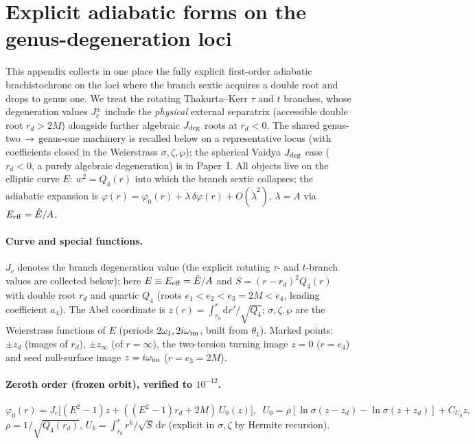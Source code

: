 \documentclass[12pt]{iopart}
\theoremstyle{plain}
\theoremstyle{definition}
\theoremstyle{remark}
\newcommand{\Ehat}{\hat E}
\newcommand{\Jc}{J_{c}}
\newcommand{\dd}{\mathrm{d}}
\begin{document}
\clearpage












\section{Explicit adiabatic forms on the genus-degeneration loci}
\label{app:separatrix}
This appendix collects in one place the fully explicit first-order adiabatic
brachistochrone on the loci where the branch sextic acquires a double root and drops to
genus one. We treat the rotating Thakurta--Kerr $\tau$ and $t$ branches, whose degeneration
values $\Jc^\pm$ include the \emph{physical} external separatrix (accessible double root
$r_d>2M$) alongside further algebraic $J_{\rm deg}$ roots at $r_d<0$. The shared
genus-two$\,\to\,$genus-one machinery is recalled below on a representative locus (with
coefficients closed in the Weierstrass $\sigma,\zeta,\wp$); the spherical Vaidya
$J_{\rm deg}$ case ($r_d<0$, a purely algebraic degeneration) is in Paper~I. All objects
live on the elliptic curve $E:\,w^2=Q_4(r)$ into which the branch sextic collapses; the
adiabatic expansion is $\varphi(r)=\varphi_0(r)+\dot\lambda\,\delta\varphi(r)+
O(\dot\lambda^2)$, $\lambda=A$ via $E_{\rm eff}=\Ehat/A$.

\paragraph{Curve and special functions.}
$\Jc$ denotes the branch degeneration value (the explicit rotating $\tau$- and
$t$-branch values are collected below); here $E\equiv E_{\rm eff}=\Ehat/A$ and
$S=(r-r_d)^2Q_4(r)$ with double root $r_d$ and quartic $Q_4$ (roots
$e_1<e_2<e_3=2M<e_4$, leading coefficient $a_4$). The Abel coordinate is
$z(r)=\int_{r_0}^r\dd r'/\sqrt{Q_4}$; $\sigma,\zeta,\wp$ are the Weierstrass functions
of $E$ (periods $2\omega_1,2i\omega_{\rm im}$, built from $\theta_1$). Marked points:
$\pm z_d$ (images of $r_d$), $\pm z_\infty$ (of $r=\infty$), the two-torsion turning
image $z=0$ ($r=e_4$) and seed null-surface image $z=i\omega_{\rm im}$ ($r=e_3=2M$).

\paragraph{Zeroth order (frozen orbit), verified to $10^{-12}$.}
\begin{equation}
\varphi_0(r)=\Jc\big[(E^2-1)z+((E^2-1)r_d+2M)\,U_0(z)\big],\;\;
U_0=\rho[\ln\sigma(z{-}z_d)-\ln\sigma(z{+}z_d)]+C_{U_0}z,
\end{equation}
$\rho=1/\sqrt{Q_4(r_d)}$, $U_k=\int_{r_0}^r r^k/\sqrt S\,\dd r$ (explicit in
$\sigma,\zeta$ by Hermite recursion).
\end{document}
